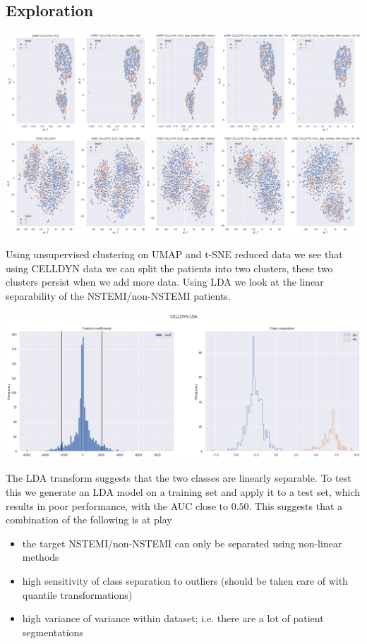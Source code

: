 \documentclass[a4paper,10pt]{article}
\begin{document}
\subsection{Exploration}
%
\begin{center}
 \includegraphics[bb=0 0 1643 931,scale=0.25,keepaspectratio=true]{images/Clustering.png}
\end{center}
%
Using unsupervised clustering on UMAP and t-SNE reduced data we see that using CELLDYN data we can split the patients into two clusters, these two clusters persist when we add more data. 
%
Using LDA we look at the linear separability of the NSTEMI/non-NSTEMI patients.
%
\begin{center}
 \includegraphics[bb=0 0 1284 526,scale=0.2]{images/LDA_full.png}
\end{center}
%
The LDA transform suggests that the two classes are linearly separable. To test this we generate
an LDA model on a training set and apply it to a test set, which results in poor performance, with the AUC 
close to $0.50$. This suggests that a combination of the following is at play  
\begin{itemize}
\item the target NSTEMI/non-NSTEMI can only be separated using non-linear methods
\item high sensitivity of class separation to outliers (should be taken care of with quantile transformations)
\item high variance of variance within dataset; i.e. there are a lot of patient segmentations
\end{itemize}
\end{document}
